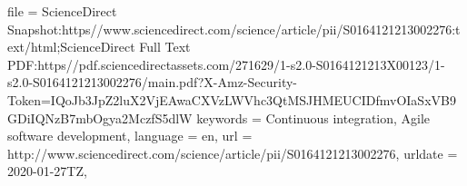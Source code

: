 {{{{{{{{  file     = {ScienceDirect Snapshot:https\://www.sciencedirect.com/science/article/pii/S0164121213002276:text/html;ScienceDirect Full Text PDF:https\://pdf.sciencedirectassets.com/271629/1-s2.0-S0164121213X00123/1-s2.0-S0164121213002276/main.pdf?X-Amz-Security-Token=IQoJb3JpZ2luX2VjEAwaCXVzLWVhc3QtMSJHMEUCIDfmvOIaSxVB9GDiIQNzB7mbOgya2MczfS5dlW%
  keywords = {Continuous integration, Agile software development},
  language = {en},
  url      = {http://www.sciencedirect.com/science/article/pii/S0164121213002276},
  urldate  = {2020-01-27TZ},
}

}}}}}}}}
